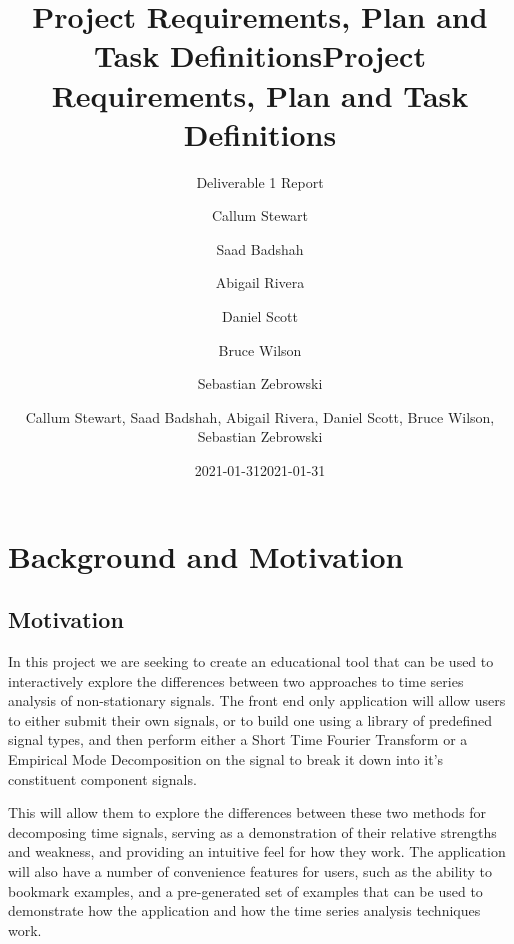 \documentclass[
  english,
  paper=a4,
  oneside  ,captions=tableheading
]{scrbook}
\title{Project Requirements, Plan and Task Definitions}
\subtitle{Deliverable 1 Report}
\author{Callum Stewart \and Saad Badshah \and Abigail Rivera \and Daniel
Scott \and Bruce Wilson \and Sebastian Zebrowski}
\date{2021-01-31}
\title{Project Requirements, Plan and Task Definitions}
\author{Callum Stewart, Saad Badshah, Abigail Rivera, Daniel
Scott, Bruce Wilson, Sebastian Zebrowski}
\date{2021-01-31}
\begin{document}
\begin{titlepage}
\afterpage{\restorepagecolor}
\newcommand{\colorRule}[3][black]{\textcolor[HTML]{#1}{\rule{#2}{#3}}}
\end{titlepage}
\restoregeometry



\hypertarget{background-and-motivation}{%
\section{Background and Motivation}\label{background-and-motivation}}

\hypertarget{motivation}{%
\subsection{Motivation}\label{motivation}}

In this project we are seeking to create an educational tool that can be
used to interactively explore the differences between two approaches to
time series analysis of non-stationary signals. The front end only
application will allow users to either submit their own signals, or to
build one using a library of predefined signal types, and then perform
either a Short Time Fourier Transform or a Empirical Mode Decomposition
on the signal to break it down into it's constituent component signals.

This will allow them to explore the differences between these two
methods for decomposing time signals, serving as a demonstration of
their relative strengths and weakness, and providing an intuitive feel
for how they work. The application will also have a number of
convenience features for users, such as the ability to bookmark
examples, and a pre-generated set of examples that can be used to
demonstrate how the application and how the time series analysis
techniques work.
\end{document}
